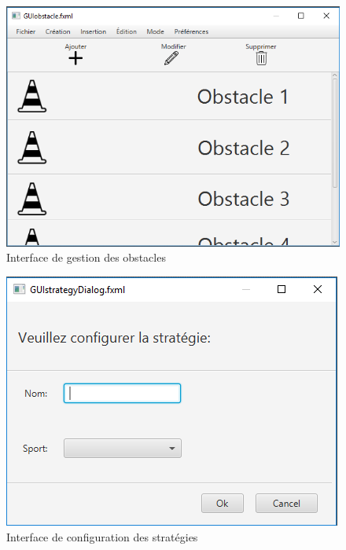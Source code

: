 \begin{figure}[htpb]
    \centering
    \includegraphics[scale=0.7]{fig/gui/gui_obstacles.png}
    \caption{Interface de gestion des obstacles}
    \label{fig:gui:gui_obstacles}
\end{figure}

\begin{figure}[htpb]
    \centering
    \includegraphics[scale=0.7]{fig/gui/gui_strategie_dialog.png}
    \caption{Interface de configuration des stratégies}
    \label{fig:gui:gui_strategie_dialog}
\end{figure}

